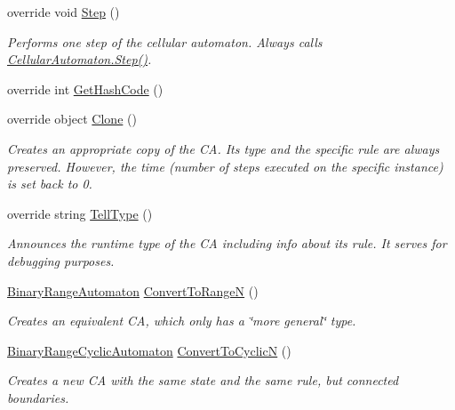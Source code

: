 \begin{DoxyCompactItemize}
override void \hyperlink{class_cellular_1_1_elementary_automaton_adae7c322e4c7cd00cd0534a23d1abfa4}{Step} ()
\begin{DoxyCompactList}\small\item\em Performs one step of the cellular automaton. Always calls {\ttfamily \hyperlink{class_cellular_1_1_cellular_automaton_aa70848d58015575974bc875ac5a89ae7}{Cellular\+Automaton.\+Step()}}. \end{DoxyCompactList}\item 
override int \hyperlink{class_cellular_1_1_elementary_automaton_abaa1bb77264571ec245155f079fe1ff0}{Get\+Hash\+Code} ()
\item 
override object \hyperlink{class_cellular_1_1_elementary_automaton_ada4ddee98167e8f4f4b6dea1f7563b47}{Clone} ()
\begin{DoxyCompactList}\small\item\em Creates an appropriate copy of the C\+A. Its type and the specific rule are always preserved. However, the time (number of steps executed on the specific instance) is set back to 0. \end{DoxyCompactList}\item 
override string \hyperlink{class_cellular_1_1_elementary_automaton_a812677139d560e2c600226361b785995}{Tell\+Type} ()
\begin{DoxyCompactList}\small\item\em Announces the runtime type of the C\+A including info about its rule. It serves for debugging purposes. \end{DoxyCompactList}\item 
\hyperlink{class_cellular_1_1_binary_range_automaton}{Binary\+Range\+Automaton} \hyperlink{class_cellular_1_1_elementary_automaton_aef244148e0234495c1f0afaef7f22e28}{Convert\+To\+Range\+N} ()
\begin{DoxyCompactList}\small\item\em Creates an equivalent C\+A, which only has a \char`\"{}more general\char`\"{} type. \end{DoxyCompactList}\item 
\hyperlink{class_cellular_1_1_binary_range_cyclic_automaton}{Binary\+Range\+Cyclic\+Automaton} \hyperlink{class_cellular_1_1_elementary_automaton_a8876a09ba28af93b0e5163eef3cbe79e}{Convert\+To\+Cyclic\+N} ()
\begin{DoxyCompactList}\small\item\em Creates a new C\+A with the same state and the same rule, but connected boundaries. \end{DoxyCompactList}\end{DoxyCompactItemize}
